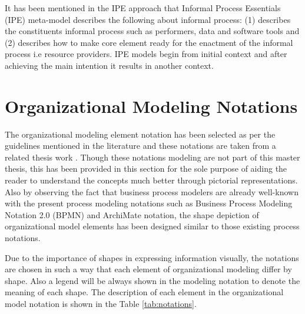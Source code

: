 It has been mentioned in the IPE approach that Informal Process Essentials (IPE) meta-model describes the following about informal process: (1) describes the constituents informal process such as performers, data and software tools and (2) describes how to make core element ready for the enactment of the informal process i.e resource providers. IPE models begin from initial context and after achieving the main intention it results in another context. 


\section{Organizational Modeling Notations}
\label{sec:resourcecentricorganizationalmodeling}
The organizational modeling element notation has been selected as per the guidelines mentioned in the literature \cite{Moody2009} and these notations are taken from a related thesis work \cite{Sierr2015}. Though these notations modeling are not part of this master thesis, this has been provided in this section for the sole purpose of aiding the reader to understand the concepts much better through pictorial representations. Also by observing  the fact that business process modelers are already well-known with the present process modeling notations such as Business Process Modeling Notation 2.0 (BPMN) \cite{bpm2011} and ArchiMate notation\cite{arc2013}, the shape depiction of organizational model elements has been designed similar to those existing process notations. 

Due to the importance of shapes in expressing information visually, the notations are chosen in such a way that each element of organizational modeling  differ by shape. Also a legend will be always shown in the modeling notation to denote the meaning of each shape. The description of each element in the organizational model notation is shown in the Table \ref{tab:notations}. 

